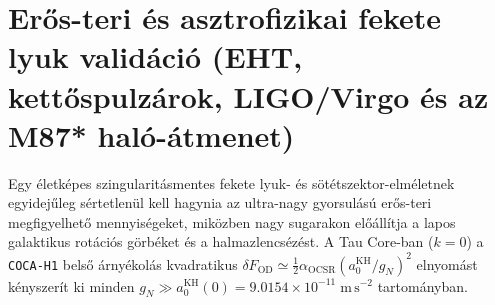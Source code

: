\documentclass[11pt,a4paper]{article}
\theoremstyle{remark}
\begin{document}
\section{Er\H{o}s-teri \'es asztrofizikai fekete lyuk valid\'aci\'o (EHT, kett\H{o}spulz\'arok, LIGO/Virgo \'es az M87* hal\'o-\'atmenet)}
\label{sec:bh_validation}

Egy \'eletk\'epes szingularit\'asmentes fekete lyuk- \'es s\"ot\'etszektor-elm\'eletnek egyidej\H{u}leg s\'ertetlen\"ul kell hagynia az ultra-nagy gyorsul\'as\'u er\H{o}s-teri megfigyelhet\H{o} mennyis\'egeket, mik\"ozben nagy sugarakon el\H{o}\'all\'itja a lapos galaktikus rot\'aci\'os g\"orb\'eket \'es a halmazlencs\'ez\'est. A Tau Core-ban ($k = 0$) a \texttt{COCA-H1} bels\H{o} \'arny\'ekol\'as kvadratikus $\delta F_{\mathrm{OD}} \simeq \frac{1}{2}\alpha_{\mathrm{OCSR}}(a_0^{\mathrm{KH}} / g_N)^2$ elnyom\'ast k\'enyszer\'it ki minden $g_N \gg a_0^{\mathrm{KH}}(0) = 9.0154 \times 10^{-11}\;\mathrm{m\,s^{-2}}$ tartom\'anyban.
\end{document}
